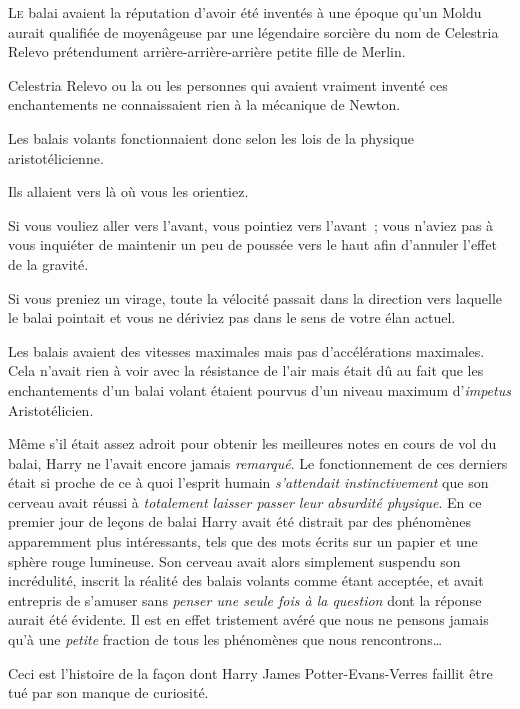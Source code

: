 
\lettrine{L}{e} balai avaient la réputation d'avoir été inventés à une époque qu'un Moldu aurait qualifiée de moyenâgeuse par une légendaire sorcière du nom de Celestria Relevo prétendument arrière-arrière-arrière petite fille de Merlin.

Celestria Relevo ou la ou les personnes qui avaient vraiment inventé ces enchantements ne connaissaient rien à la mécanique de Newton.

Les balais volants fonctionnaient donc selon les lois de la physique aristotélicienne.

Ils allaient vers là où vous les orientiez.

Si vous vouliez aller vers l'avant, vous pointiez vers l'avant~; vous n'aviez pas à vous inquiéter de maintenir un peu de poussée vers le haut afin d'annuler l'effet de la gravité.

Si vous preniez un virage, toute la vélocité passait dans la direction vers laquelle le balai pointait et vous ne dériviez pas dans le sens de votre élan actuel.

Les balais avaient des vitesses maximales mais pas d'accélérations maximales. Cela n'avait rien à voir avec la résistance de l'air mais était dû au fait que les enchantements d'un balai volant étaient pourvus d'un niveau maximum d'\emph{impetus} Aristotélicien.

Même s'il était assez adroit pour obtenir les meilleures notes en cours de vol du balai, Harry ne l'avait encore jamais \emph{remarqué}. Le fonctionnement de ces derniers était si proche de ce à quoi l'esprit humain \emph{s'attendait instinctivement} que son cerveau avait réussi à \emph{totalement laisser passer leur absurdité physique}. En ce premier jour de leçons de balai Harry avait été distrait par des phénomènes apparemment plus intéressants, tels que des mots écrits sur un papier et une sphère rouge lumineuse. Son cerveau avait alors simplement suspendu son incrédulité, inscrit la réalité des balais volants comme étant acceptée, et avait entrepris de s'amuser sans \emph{penser une seule fois à la question} dont la réponse aurait été évidente. Il est en effet tristement avéré que nous ne pensons jamais qu'à une \emph{petite} fraction de tous les phénomènes que nous rencontrons…

Ceci est l'histoire de la façon dont Harry James Potter-Evans-Verres faillit être tué par son manque de curiosité.

